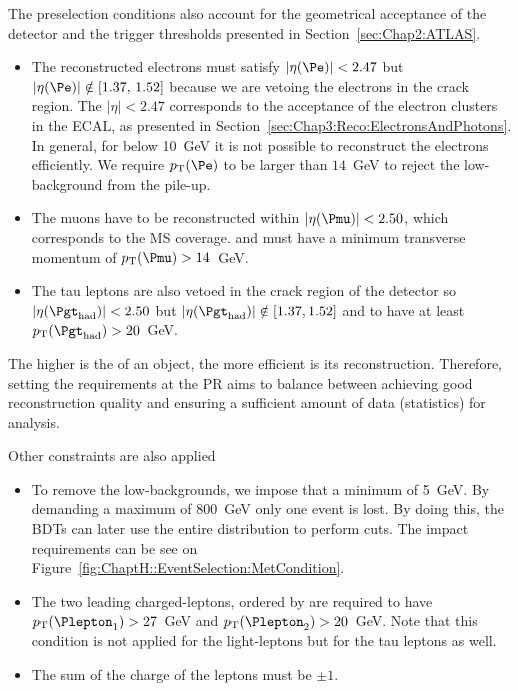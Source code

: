 The preselection conditions also account for the geometrical acceptance of the 
detector and the trigger thresholds presented in Section~\ref{sec:Chap2:ATLAS}.
\begin{itemize}
	\item The reconstructed electrons must satisfy $|\eta(\Pe)|<2.47$ but $|\eta(\Pe)| \notin [1.37,\, 1.52]$ because
	we are vetoing the electrons in the crack region.  The $|\eta|<2.47$ corresponds to the acceptance of the electron
	clusters in the ECAL, as presented in Section~\ref{sec:Chap3:Reco:ElectronsAndPhotons}. In general, for \pT below 10~GeV it is not
	possible to reconstruct the electrons efficiently.
	We require $\pT(\Pe)$ to be larger than $14$~GeV to reject the low-\pT background from the pile-up.
	\item The muons have to be reconstructed within $|\eta(\Pmu)|<2.50$, which corresponds to the MS coverage.
	and must have a minimum transverse momentum of $\pT(\Pmu)>14$~GeV.
	\item The tau leptons are also vetoed in the crack region of the detector so $|\eta(\tauhad)|<2.50$ but 
	$|\eta(\tauhad)| \notin [1.37, 1.52]$ and to have at least $\pT(\tauhad)>20$~GeV.
\end{itemize}
The higher is the \pT of an object, the more efficient is its reconstruction. Therefore,
setting the \pT requirements at the PR aims to balance between achieving
good reconstruction quality and ensuring a sufficient amount of data (statistics) for analysis.

Other constraints are also applied
\begin{itemize}
	\item To remove the low-\MET backgrounds, we impose that a minimum \MET of 5~GeV.
	By demanding a maximum \MET of 800~GeV only one event is lost. By doing this, the BDTs can
	later use the entire \MET distribution to perform cuts. 
	The impact \MET requirements can be see on Figure~\ref{fig:ChaptH::EventSelection:MetCondition}.
	\item The two leading charged-leptons, ordered by \pT are required to have $\pT(\Plepton_{1})>27$~GeV
	and $\pT(\Plepton_{2})>20$~GeV.
	Note that this condition is not applied for the light-leptons but for the tau leptons as well.
	\item The sum of the charge of the leptons must be $\pm1$.
\end{itemize}

